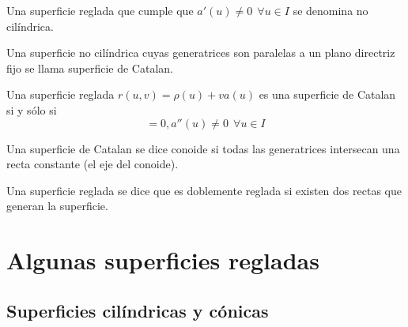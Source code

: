 \documentclass[10pt,a4paper]{article}
\begin{document}
\begin{defi}
	Una superficie reglada que cumple que $a'(u) \neq 0 \ \ \forall u \in I$ se denomina no cilíndrica. 
\end{defi}

\begin{defi}
	Una superficie no cilíndrica cuyas generatrices son paralelas a un plano directriz fijo se llama superficie de Catalan.
\end{defi}

\begin{teo}
	Una superficie reglada $r(u,v) = \rho(u) + v a(u)$ es una superficie de Catalan si y sólo si
	\begin{equation}
	[a(u), a'(a), a''(u)] = 0,  a''(u) \neq 0 \ \ \forall u \in I
	\end{equation}
\end{teo}

\begin{defi}
	Una superficie de Catalan se dice conoide si todas las generatrices intersecan una recta constante (el eje del conoide).
\end{defi}

\begin{defi}
	Una superficie reglada se dice que es doblemente reglada si existen dos rectas que generan la superficie.
\end{defi}

\section{Algunas superficies regladas}

\subsection{Superficies cilíndricas y cónicas}
\end{document}
